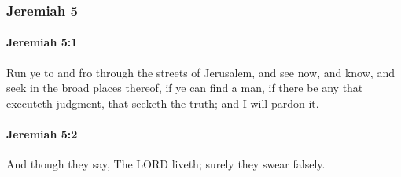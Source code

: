 	\subsubsection{Jeremiah 5} %
		\label{JEREMIAH-5}

		\paragraph{Jeremiah 5:1} %
			\label{JEREMIAH-5-1}

			Run ye to and fro through the streets of Jerusalem, and see now, and know, and seek in the broad places thereof, if ye can find a man, if there be any that executeth judgment, that seeketh the truth; and I will pardon it.


		\paragraph{Jeremiah 5:2} %
			\label{JEREMIAH-5-2}

			And though they say, The LORD liveth; surely they swear falsely.

